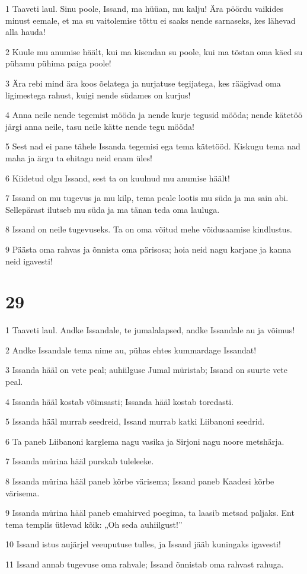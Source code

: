 \par 1 Taaveti laul. Sinu poole, Issand, ma hüüan, mu kalju! Ära pöördu vaikides minust eemale, et ma su vaitolemise tõttu ei saaks nende sarnaseks, kes lähevad alla hauda!
\par 2 Kuule mu anumise häält, kui ma kisendan su poole, kui ma tõstan oma käed su pühamu pühima paiga poole!
\par 3 Ära rebi mind ära koos õelatega ja nurjatuse tegijatega, kes räägivad oma ligimestega rahust, kuigi nende südames on kurjus!
\par 4 Anna neile nende tegemist mööda ja nende kurje tegusid mööda; nende kätetöö järgi anna neile, tasu neile kätte nende tegu mööda!
\par 5 Sest nad ei pane tähele Issanda tegemisi ega tema kätetööd. Kiskugu tema nad maha ja ärgu ta ehitagu neid enam üles!
\par 6 Kiidetud olgu Issand, sest ta on kuulnud mu anumise häält!
\par 7 Issand on mu tugevus ja mu kilp, tema peale lootis mu süda ja ma sain abi. Sellepärast ilutseb mu süda ja ma tänan teda oma lauluga.
\par 8 Issand on neile tugevuseks. Ta on oma võitud mehe võidusaamise kindlustus.
\par 9 Päästa oma rahvas ja õnnista oma pärisosa; hoia neid nagu karjane ja kanna neid igavesti!

\chapter{29}

\par 1 Taaveti laul. Andke Issandale, te jumalalapsed, andke Issandale au ja võimus!
\par 2 Andke Issandale tema nime au, pühas ehtes kummardage Issandat!
\par 3 Issanda hääl on vete peal; auhiilguse Jumal müristab; Issand on suurte vete peal.
\par 4 Issanda hääl kostab võimsasti; Issanda hääl kostab toredasti.
\par 5 Issanda hääl murrab seedreid, Issand murrab katki Liibanoni seedrid.
\par 6 Ta paneb Liibanoni karglema nagu vasika ja Sirjoni nagu noore metshärja.
\par 7 Issanda mürina hääl purskab tuleleeke.
\par 8 Issanda mürina hääl paneb kõrbe värisema; Issand paneb Kaadesi kõrbe värisema.
\par 9 Issanda mürina hääl paneb emahirved poegima, ta laasib metsad paljaks. Ent tema templis ütlevad kõik: „Oh seda auhiilgust!”
\par 10 Issand istus aujärjel veeuputuse tulles, ja Issand jääb kuningaks igavesti!
\par 11 Issand annab tugevuse oma rahvale; Issand õnnistab oma rahvast rahuga.

